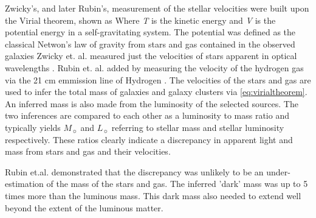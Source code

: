 Zwicky's, and later Rubin's, measurement of the stellar velocities were built upon the Virial theorem, shown as \virialtheorem
Where \textit{T} is the kinetic energy and \textit{V} is the potential energy in a self-gravitating system.
The potential was defined as the classical Netwon's law of gravity from stars and gas contained in the observed galaxies \newtongravity
Zwicky et. al. measured just the velocities of stars apparent in optical wavelengths \cite{Zwicky:1933}.
Rubin et. al. added by measuring the velocity of the hydrogen gas via the 21 cm emmission line of Hydrogen \cite{Rubin:1978}.
The velocities of the stars and gas are used to infer the total mass of galaxies and galaxy clusters via \cref{eq:virialtheorem}.
An inferred mass is also made from the luminosity of the selected sources.
The two inferences are compared to each other as a luminosity to mass ratio and typically yields \cite{Greene:cosmology_dm}\masslightratio
$M_{\sun}$ and $L_{\sun}$ referring to stellar mass and stellar luminosity respectively.
These ratios clearly indicate a discrepancy in apparent light and mass from stars and gas and their velocities.

Rubin et.al. \cite{Rubin:1978} demonstrated that the discrepancy was unlikely to be an under-estimation of the mass of the stars and gas.
The inferred 'dark' mass was up to 5 times more than the luminous mass.
This dark mass also needed to extend well beyond the extent of the luminous matter.

\begin{figure}[h]
\end{figure}


